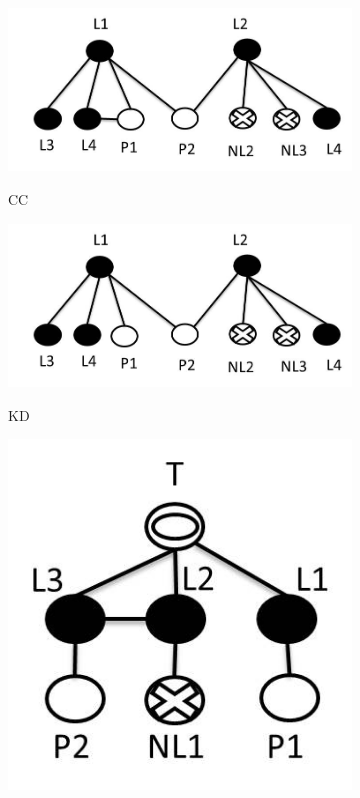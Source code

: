 \documentclass[journal]{IEEEtran}
\begin{document}
\begin{figure}
\centering
\begin{subfigure}{.39\textwidth}
\centering
  \includegraphics[width=\linewidth]{cc.jpg}\\
   \caption{CC}\label{fig:cc}
\end{subfigure}
\begin{subfigure}{.39\textwidth}
\centering
  \includegraphics[width=\linewidth]{KD_NEW.jpg}\\
   \caption{KD}\label{fig:kd}
\end{subfigure}
\begin{subfigure}{.19\textwidth}
  \centering
  \includegraphics[width=\linewidth]{FM_BTF.jpg}\\

\end{subfigure}
\end{figure}
\end{document}
